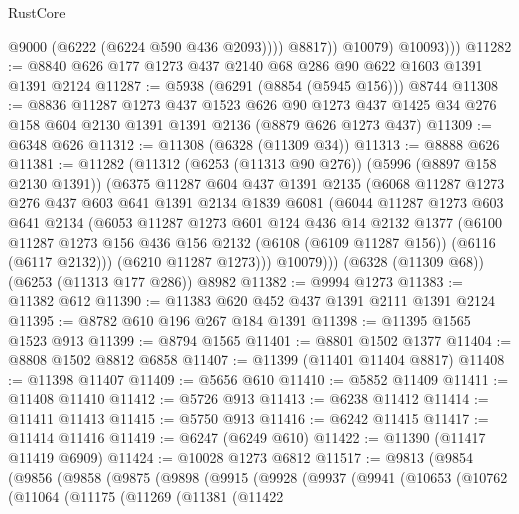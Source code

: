 \begin{lexlean}{RustCore}
\begin{coremodule}
                    @9000
                    (@6222 (@6224 @590 @436 @2093))))
                @8817))
            @10079)
          @10093)))
@11282 := @8840 @626 @177 @1273 @437 @2140 @68 @286 @90 @622 @1603 @1391 @1391 @2124
@11287 := @5938 (@6291 (@8854 (@5945 @156))) @8744
@11308 := @8836
    @11287
    @1273
    @437
    @1523
    @626
    @90
    @1273
    @437
    @1425
    @34
    @276
    @158
    @604
    @2130
    @1391
    @1391
    @2136
    (@8879 @626 @1273 @437)
@11309 := @6348 @626
@11312 := @11308 (@6328 (@11309 @34))
@11313 := @8888 @626
@11381 := @11282
    (@11312
      (@6253 (@11313 @90 @276))
      (@5996 (@8897 @158 @2130 @1391))
      (@6375
        @11287
        @604
        @437
        @1391
        @2135
        (@6068
          @11287
          @1273
          @276
          @437
          @603
          @641
          @1391
          @2134
          @1839
          @6081
          (@6044
            @11287
            @1273
            @603
            @641
            @2134
            (@6053
              @11287
              @1273
              @601
              @124
              @436
              @14
              @2132
              @1377
              (@6100
                @11287
                @1273
                @156
                @436
                @156
                @2132
                (@6108 (@6109 @11287 @156))
                (@6116 (@6117 @2132)))
              (@6210 @11287 @1273)))
          @10079)))
    (@6328 (@11309 @68))
    (@6253 (@11313 @177 @286))
    @8982
@11382 := @9994 @1273
@11383 := @11382 @612
@11390 := @11383 @620 @452 @437 @1391 @2111 @1391 @2124
@11395 := @8782 @610 @196 @267 @184 @1391
@11398 := @11395 @1565 @1523 @913
@11399 := @8794 @1565
@11401 := @8801 @1502 @1377
@11404 := @8808 @1502 @8812 @6858
@11407 := @11399 (@11401 @11404 @8817)
@11408 := @11398 @11407
@11409 := @5656 @610
@11410 := @5852 @11409
@11411 := @11408 @11410
@11412 := @5726 @913
@11413 := @6238 @11412
@11414 := @11411 @11413
@11415 := @5750 @913
@11416 := @6242 @11415
@11417 := @11414 @11416
@11419 := @6247 (@6249 @610)
@11422 := @11390 (@11417 @11419 @6909)
@11424 := @10028 @1273 @6812
@11517 := @9813
    (@9854
      (@9856
        (@9858
          (@9875
            (@9898
              (@9915
                (@9928
                  (@9937
                    (@9941
                      (@10653
                        (@10762
                          (@11064
                            (@11175
                              (@11269
                                (@11381
                                  (@11422

\end{coremodule}
\end{lexlean}
